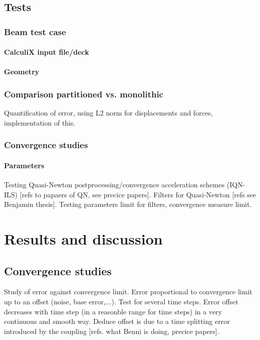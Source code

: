 \documentclass[a4paper, 11pt, oneside]{Thesis}  %
\begin{document}
\section{Tests}
\subsection{Beam test case}
\subsubsection{CalculiX input file/deck}
\subsubsection{Geometry}
\subsection{Comparison partitioned vs. monolithic}
Quantification of error, using L2 norm for displacements and forces, implementation of this.
\subsection{Convergence studies}
\subsubsection{Parameters}
Testing Quasi-Newton postprocessing/convergence acceleration schemes (IQN-ILS) [refs to papaers of QN, see precice papers]. Filters for Quasi-Newton [refs see Benjamin thesis].
Testing parameters limit for filters, convergence measure limit.



\chapter{Results and discussion}

\section{Convergence studies}
Study of error against convergence limit. Error proportional to convergence limit up to an offset (noise, base error,...). Test for several time steps. Error offset decreases with time step (in a reasonble range for time steps) in a very continuous and smooth way. Deduce offset is due to a time splitting error introduced by the coupling [refs. what Benni is doing, precice papers].
\end{document}

